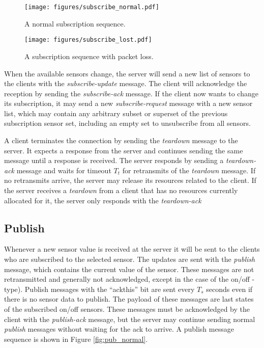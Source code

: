 \documentclass[a4paper]{article}
\begin{document}
\begin{figure}[h]
	\centering
    \texttt{[image: figures/subscribe\_normal.pdf]}
    \caption{A normal subscription sequence.}
    \label{fig:sub_normal}
\end{figure}

\begin{figure}[h]
	\centering
    \texttt{[image: figures/subscribe\_lost.pdf]}
    \caption{A subscription sequence with packet loss.}
    \label{fig:sub_lost}
\end{figure}

\newpage

When the available sensors change, the server will send a new list of sensors
to the clients with the \emph{subscribe-update} message. The client will
acknowledge the reception by sending the \emph{subscribe-ack} message. If the
client now wants to change its subscription, it may send a new 
\emph{subscribe-request} message with a new sensor list, which may contain any arbitrary subset or superset of the previous subscription sensor set, including an empty set to unsubscribe from all sensors.

A client terminates the connection by sending the \emph{teardown} message to the
server. It expects a response from the server and continues sending the same
message until a response is received. The server responds by sending a
\emph{teardown-ack} message and waits for timeout $T_t$ for retransmits of the \emph{teardown} message. If no retransmits arrive, the server may release its resources
related to the client. If the server receives a \emph{teardown} from a client that has no resources currently allocated for it, the server only responds with the \emph{teardown-ack}

\subsection{Publish}
Whenever a new sensor value is received at the server it will be sent to the 
clients who are subscribed to the selected sensor. The updates are sent with
the \emph{publish} message, which contains the current value of the sensor.
These messages are not retransmitted and generally not acknowledged, except in the case of the on/off -type). Publish
messages with the ``ackthis'' bit are sent every $T_s$ seconds even if there
is no sensor data to publish. The payload of these messages are last states
of the subscribed on/off sensors. These messages must be acknowledged by the client 
with the \emph{publish-ack} message, but the server may continue sending normal \emph{publish} messages without waiting for the ack to arrive. A publish message
sequence is shown in Figure \ref{fig:pub_normal}.
\end{document}
